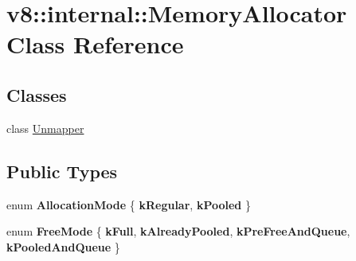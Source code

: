 \hypertarget{classv8_1_1internal_1_1MemoryAllocator}{}\section{v8\+:\+:internal\+:\+:Memory\+Allocator Class Reference}
\label{classv8_1_1internal_1_1MemoryAllocator}
\subsection*{Classes}
\begin{DoxyCompactItemize}
\item 
class \mbox{\hyperlink{classv8_1_1internal_1_1MemoryAllocator_1_1Unmapper}{Unmapper}}
\end{DoxyCompactItemize}
\subsection*{Public Types}
\begin{DoxyCompactItemize}
\item 
\mbox{\label{classv8_1_1internal_1_1MemoryAllocator_a11e35bec1fa662a922430a198cf7bbab}} 
enum {\bfseries Allocation\+Mode} \{ {\bfseries k\+Regular}, 
{\bfseries k\+Pooled}
 \}
\item 
\mbox{\label{classv8_1_1internal_1_1MemoryAllocator_a1c5f0a0deae321ce11d19b7be506ed8b}} 
enum {\bfseries Free\+Mode} \{ {\bfseries k\+Full}, 
{\bfseries k\+Already\+Pooled}, 
{\bfseries k\+Pre\+Free\+And\+Queue}, 
{\bfseries k\+Pooled\+And\+Queue}
 \}
\end{DoxyCompactItemize}
